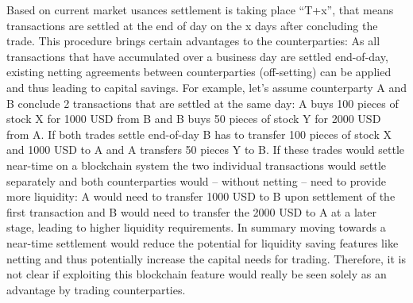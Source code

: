 Based on current market usances settlement is taking place “T+x”, that means transactions are settled at the end of day on the x days after concluding the trade. This procedure brings certain advantages to the counterparties: As all transactions that have accumulated over a business day are settled end-of-day, existing netting agreements between counterparties (off-setting) can be applied and thus leading to capital savings. For example, let’s assume counterparty A and B conclude 2 transactions that are settled at the same day: A buys 100 pieces of stock X for 1000 USD from B and B buys 50 pieces of stock Y for 2000 USD from A. If both trades settle end-of-day B has to transfer 100 pieces of stock X and 1000 USD to A and A transfers 50 pieces Y to B. If these trades would settle near-time on a blockchain system the two individual transactions would settle separately and both counterparties would – without netting – need to provide more liquidity: A would need to transfer 1000 USD to B upon settlement of the first transaction and B would need to transfer the 2000 USD to A at a later stage, leading to higher liquidity requirements. In summary moving towards a near-time settlement would reduce the potential for liquidity saving features like netting and thus potentially increase the capital needs for trading. Therefore, it is not clear if exploiting this blockchain feature would really be seen solely as an advantage by trading counterparties. 